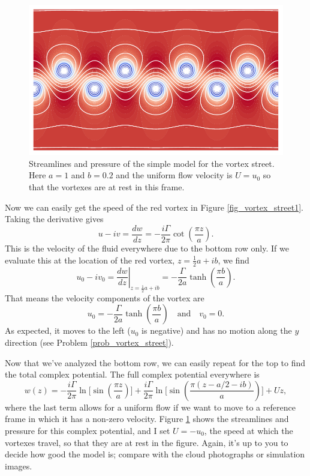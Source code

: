 \begin{figure}
\centering\includegraphics[width=0.95\linewidth]{Figures/Chapter4/fig_vortex_street2}
\caption{Streamlines and pressure of the simple model for the vortex street.  Here $a = 1$ and $b = 0.2$ and the uniform flow velocity is $U = u_0$ so that the vortexes are at rest in this frame. }
\label{fig_vortex_street2}
\end{figure}

Now we can easily get the speed of the red vortex in Figure \ref{fig_vortex_street1}.  Taking the derivative gives
\[
u - iv = \frac{dw}{dz} = -\frac{i\Gamma}{2\pi} \cot \left( \frac{\pi z}{a} \right).
\]
This is the velocity of the fluid everywhere due to the bottom row only.  If we evaluate this at the location of the red vortex, $z = \tfrac{1}{2} a + ib$, we find
\[
u_0 - iv_0 = \left. \frac{dw}{dz} \right|_{z = \tfrac{1}{2} a + ib} = -\frac{\Gamma}{2a} \tanh \left( \frac{\pi b }{a} \right).
\]
That means the velocity components of the vortex are
\begin{equation}
\label{eq_vortex_street_speed}
u_0 = -\frac{\Gamma}{2a} \tanh \left( \frac{\pi b }{a} \right) \quad \text{and} \quad v_0 = 0.
\end{equation}
As expected, it moves to the left ($u_0$ is negative) and has no motion along the $y$ direction (see Problem \ref{prob_vortex_street}).

Now that we've analyzed the bottom row, we can easily repeat for the top to find the total complex potential.  The full complex potential everywhere is
\begin{equation}
w(z) = -\frac{i\Gamma}{2\pi}\ln \biggl[ \sin \left( \frac{\pi z}{a} \right) \biggr] + \frac{i\Gamma}{2\pi}\ln \biggl[ \sin \left( \frac{\pi (z - a/2 - ib)}{a} \right) \biggr] + Uz,
\end{equation}
where the last term allows for a uniform flow if we want to move to a reference frame in which it has a non-zero velocity.  Figure \ref{fig_vortex_street2} shows the streamlines and pressure for this complex potential, and I set $U = -u_0$, the speed at which the vortexes travel, so that they are at rest in the figure.  Again, it's up to you to decide how good the model is; compare with the cloud photographs or simulation images.




